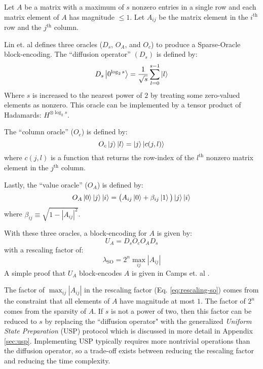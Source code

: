 Let $A$ be a matrix with a maximum of $s$ nonzero entries in a single row and each matrix element of $A$ has magnitude $\leq 1$.
Let $A_{ij}$ be the matrix element in the $i^\text{th}$ row and the $j^\text{th}$ column.

Lin et. al \cite{lin2022lecture} defines three oracles ($D_s$, $O_A$, and $O_c$) to produce a Sparse-Oracle block-encoding.
The ``diffusion operator'' $(D_s)$ is defined by:
\begin{equation}
    \label{eq:diffusion}
    D_s \ket{0^{\log_2{s}}} = \frac{1}{\sqrt{s}} \sum_{l=0}^{s-1} \ket{l}
\end{equation}
Where $s$ is increased to the nearest power of $2$ by treating some zero-valued elements as nonzero.
This oracle can be implemented by a tensor product of Hadamards: $H^{\otimes \log_2{s}}$.

The ``column oracle'' ($O_c$) is defined by: 
\begin{equation}
    \label{eq:column-oracle}
    O_c \ket{j} \ket{l} = \ket{j}\ket{c(j, l)}
\end{equation}
where $c(j, l)$ is a function that returns the row-index of the $l^\text{th}$ nonzero matrix element in the $j^\text{th}$ column.

Lastly, the ``value oracle'' ($O_A$) is defined by:
\begin{equation}
    \label{eq:value-oracle}
    O_A \ket{0} \ket{j}\ket{i} = \big( A_{ij} \ket{0}  + \beta_{ij} \ket{1} \big) \ket{j}\ket{i}
\end{equation}
where $\beta_{ij} \equiv \sqrt{1 - |A_{ij}|^2}$.

With these three oracles, a block-encoding for $A$ is given by:
\begin{equation}
    \label{eq:so-be}
    U_A = D_s O_c O_A D_s
\end{equation}
with a rescaling factor of:
\begin{equation}
    \label{eq:rescaling-so}
    \lambda_\text{SO} = 2^n \max_{ij} {|A_{ij}|} 
\end{equation}
A simple proof that $U_A$ block-encodes $A$ is given in Camps et. al \cite{camps2024explicit}.

The factor of $\max_{ij} {|A_{ij}|}$ in the rescaling factor (Eq. \ref{eq:rescaling-so}) comes from the constraint that all elements of $A$ have magnitude at most $1$.
The factor of $2^n$ comes from the sparsity of $A$.
If $s$ is not a power of two, then this factor can be reduced to $s$ by replacing the ``diffusion operator" with the generalized \textit{Uniform State Preparation} (USP) protocol which is discussed in more detail in Appendix \ref{sec:usp}.
Implementing USP typically requires more nontrivial operations than the diffusion operator, so a trade-off exists between reducing the rescaling factor and reducing the time complexity.

